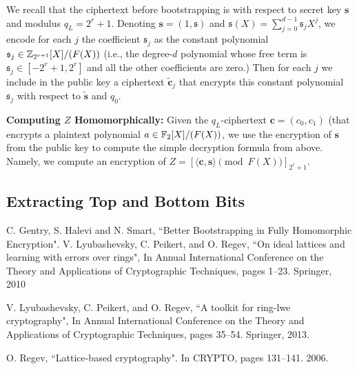 \documentclass[12pt]{article}
\theoremstyle{plain}
\theoremstyle{definition}
\theoremstyle{remark}
\begin{document}
We recall that the ciphertext before bootstrapping is with respect to secret key $\mathbf{s}$ and modulus $q_L = 2^r + 1$. Denoting $\mathbf{s} = (1, \mathfrak{s})$ and $\mathfrak{s}(X) =\sum_{j=0}^{d-1}\mathfrak{s}_jX^j$, we encode for each $j$ the coefficient $\mathfrak{s}_j$ as the constant polynomial $\mathfrak{s}_j \in \mathbb{Z}_{2^{r+1}}[X]/(F(X))$ (i.e., the degree-$d$ polynomial whose free term is $\mathfrak{s}_j \in [-2^r + 1, 2^r]$ and all the other coefficients are zero.) Then for each $j$ we include in the public key a ciphertext $\tilde{\mathbf{c}}_j$ that encrypts this constant polynomial $\mathfrak{s}_j$ with respect to $\tilde{\mathbf{s}}$ and $q_0$.

{\bf Computing $Z$ Homomorphically:} Given the $q_L$-ciphertext $\mathbf{c} = (c_0, c_1)$ (that encrypts a plaintext polynomial $a \in  \mathbb{F}_2[X]/(F(X))$, we use the encryption of $\mathbf{s}$ from the public key to compute the simple decryption formula from above. Namely, we compute an encryption of
$Z = [\langle\mathbf{c}, \mathbf{s}\rangle \pmod{F(X)}]_{2^r+1}$.

\subsection{Extracting Top and Bottom Bits}
\begin{thebibliography}{99}

  C. Gentry, S. Halevi and N. Smart, ``Better Bootstrapping in Fully Homomorphic Encryption".
 V. Lyubashevsky, C. Peikert, and O. Regev, ``On ideal lattices and learning with errors over rings", In Annual International Conference on the Theory and Applications of Cryptographic Techniques, pages 1–23. Springer, 2010

 V. Lyubashevsky, C. Peikert, and O. Regev, ``A toolkit for ring-lwe cryptography", In Annual International Conference on the Theory and Applications of Cryptographic Techniques, pages 35–54. Springer, 2013.

 O. Regev, ``Lattice-based cryptography". In CRYPTO, pages 131–141. 2006.

\end{thebibliography}
\end{document}
